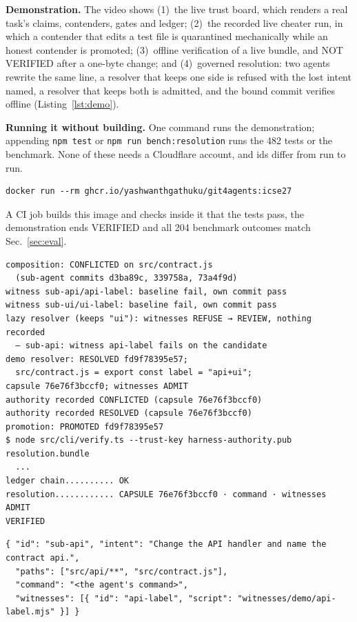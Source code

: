 \documentclass[10pt,conference]{IEEEtran}
\begin{document}
\textbf{Demonstration.} The video shows (1)~the live trust board, which renders a real task's claims, contenders, gates and ledger; (2)~the recorded live cheater run, in which a contender that edits a test file is quarantined mechanically while an honest contender is promoted; (3)~offline verification of a live bundle, and NOT VERIFIED after a one-byte change; and (4)~governed resolution: two agents rewrite the same line, a resolver that keeps one side is refused with the lost intent named, a resolver that keeps both is admitted, and the bound commit verifies offline (Listing~\ref{lst:demo}).

\textbf{Running it without building.} One command runs the demonstration; appending \texttt{npm test} or \texttt{npm run bench:resolution} runs the 482 tests or the benchmark. None of these needs a Cloudflare account, and ids differ from run to run.
\begin{lstlisting}[basicstyle=\ttfamily\scriptsize]
docker run --rm ghcr.io/yashwanthgathuku/git4agents:icse27
\end{lstlisting}
A CI job builds this image and checks inside it that the tests pass, the demonstration ends VERIFIED and all 204 benchmark outcomes match Sec.~\ref{sec:eval}.

\begin{lstlisting}[float=tp,caption={Governed-resolution demonstration output (abridged).},label={lst:demo}]
composition: CONFLICTED on src/contract.js
  (sub-agent commits d3ba89c, 339758a, 73a4f9d)
witness sub-api/api-label: baseline fail, own commit pass
witness sub-ui/ui-label: baseline fail, own commit pass
lazy resolver (keeps "ui"): witnesses REFUSE → REVIEW, nothing recorded
  — sub-api: witness api-label fails on the candidate
demo resolver: RESOLVED fd9f78395e57;
  src/contract.js = export const label = "api+ui";
capsule 76e76f3bccf0; witnesses ADMIT
authority recorded CONFLICTED (capsule 76e76f3bccf0)
authority recorded RESOLVED (capsule 76e76f3bccf0)
promotion: PROMOTED fd9f78395e57
$ node src/cli/verify.ts --trust-key harness-authority.pub resolution.bundle
  ...
ledger chain.......... OK
resolution............ CAPSULE 76e76f3bccf0 · command · witnesses ADMIT
VERIFIED
\end{lstlisting}

\begin{lstlisting}[float=tp,caption={A sub-agent with a witness in a crew configuration (abridged).},label={lst:crew}]
{ "id": "sub-api", "intent": "Change the API handler and name the contract api.",
  "paths": ["src/api/**", "src/contract.js"],
  "command": "<the agent's command>",
  "witnesses": [{ "id": "api-label", "script": "witnesses/demo/api-label.mjs" }] }
\end{lstlisting}
\end{document}
